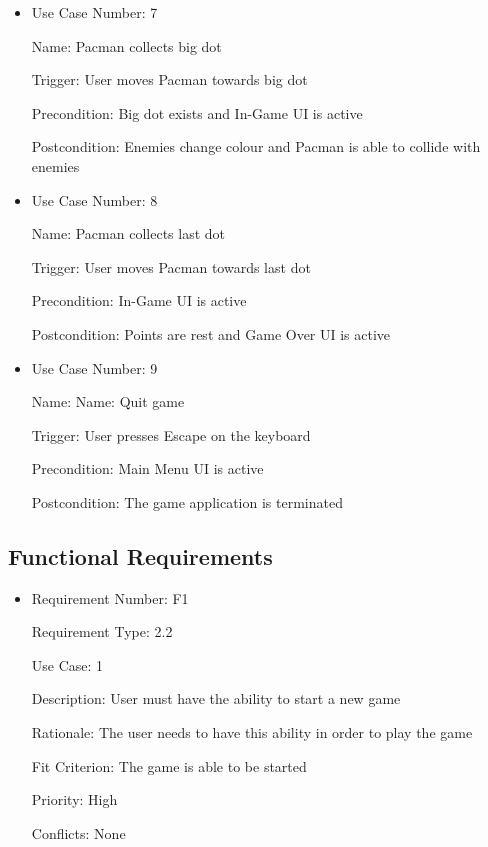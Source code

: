 \documentclass[12pt, titlepage]{article}
\begin{document}
\begin{itemize}
\item
Use Case Number: 7

Name: Pacman collects big dot

Trigger: User moves Pacman towards big dot

Precondition: Big dot exists and In-Game UI is active

Postcondition: Enemies change colour and Pacman is able to collide with enemies
\end{itemize}

\begin{itemize}
\item
Use Case Number: 8

Name: Pacman collects last dot

Trigger: User moves Pacman towards last dot

Precondition: In-Game UI is active

Postcondition: Points are rest and Game Over UI is active
\end{itemize}

\begin{itemize}
\item
Use Case Number: 9

Name: Name: Quit game

Trigger: User presses Escape on the keyboard

Precondition: Main Menu UI is active

Postcondition: The game application is terminated
\end{itemize}


\subsection{Functional Requirements}

\begin{itemize}
\item
Requirement Number: F1

Requirement Type: 2.2

Use Case: 1

Description: User must have the ability to start a new game

Rationale: The user needs to have this ability in order to play the game

Fit Criterion: The game is able to be started

Priority: High

Conflicts: None
\end{itemize}
\end{document}
